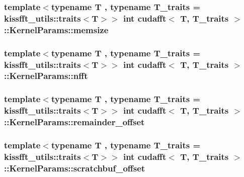 \subsubsection[{\texorpdfstring{memsize}{memsize}}]{\setlength{\rightskip}{0pt plus 5cm}template$<$typename T , typename T\+\_\+traits  = kissfft\+\_\+utils\+::traits$<$\+T$>$$>$ int {\bf cudafft}$<$ T, T\+\_\+traits $>$\+::Kernel\+Params\+::memsize}\hypertarget{structcudafft_1_1_kernel_params_aeca8012eac182feb4cec53a338a0018e}{}\label{structcudafft_1_1_kernel_params_aeca8012eac182feb4cec53a338a0018e}
\subsubsection[{\texorpdfstring{nfft}{nfft}}]{\setlength{\rightskip}{0pt plus 5cm}template$<$typename T , typename T\+\_\+traits  = kissfft\+\_\+utils\+::traits$<$\+T$>$$>$ int {\bf cudafft}$<$ T, T\+\_\+traits $>$\+::Kernel\+Params\+::nfft}\hypertarget{structcudafft_1_1_kernel_params_a4e6ea9cd74f781c767a3a7ce6eee3ff2}{}\label{structcudafft_1_1_kernel_params_a4e6ea9cd74f781c767a3a7ce6eee3ff2}
\subsubsection[{\texorpdfstring{remainder\+\_\+offset}{remainder_offset}}]{\setlength{\rightskip}{0pt plus 5cm}template$<$typename T , typename T\+\_\+traits  = kissfft\+\_\+utils\+::traits$<$\+T$>$$>$ int {\bf cudafft}$<$ T, T\+\_\+traits $>$\+::Kernel\+Params\+::remainder\+\_\+offset}\hypertarget{structcudafft_1_1_kernel_params_a677b1b8ee251eba05899356f73bc83da}{}\label{structcudafft_1_1_kernel_params_a677b1b8ee251eba05899356f73bc83da}
\subsubsection[{\texorpdfstring{scratchbuf\+\_\+offset}{scratchbuf_offset}}]{\setlength{\rightskip}{0pt plus 5cm}template$<$typename T , typename T\+\_\+traits  = kissfft\+\_\+utils\+::traits$<$\+T$>$$>$ int {\bf cudafft}$<$ T, T\+\_\+traits $>$\+::Kernel\+Params\+::scratchbuf\+\_\+offset}\hypertarget{structcudafft_1_1_kernel_params_a4eafcb24027353ff226701187e4d5b92}{}\label{structcudafft_1_1_kernel_params_a4eafcb24027353ff226701187e4d5b92}
